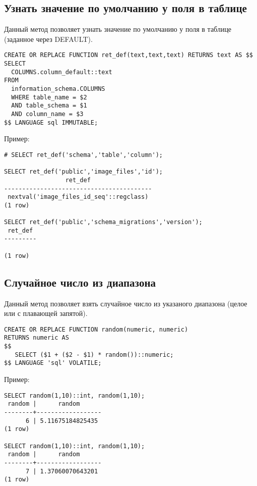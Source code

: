 \subsection{Узнать значение по умолчанию у поля в таблице}
Данный метод позволяет узнать значение по умолчанию у поля в таблице (заданное через DEFAULT).

\begin{lstlisting}[label=lst:snippets6,title=snippets/default\_value.sql]
CREATE OR REPLACE FUNCTION ret_def(text,text,text) RETURNS text AS $$
SELECT
  COLUMNS.column_default::text
FROM
  information_schema.COLUMNS
  WHERE table_name = $2
  AND table_schema = $1
  AND column_name = $3
$$ LANGUAGE sql IMMUTABLE;
\end{lstlisting}

Пример:
\begin{lstlisting}[label=lst:snippets7,caption=Узнать значение по умолчанию у поля в таблице. Пример]
# SELECT ret_def('schema','table','column');

SELECT ret_def('public','image_files','id');
                 ret_def
-----------------------------------------
 nextval('image_files_id_seq'::regclass)
(1 row)

SELECT ret_def('public','schema_migrations','version');
 ret_def
---------

(1 row)
\end{lstlisting}

\subsection{Случайное число из диапазона}
Данный метод позволяет взять случайное число из указаного диапазона (целое или с плавающей запятой).

\begin{lstlisting}[label=lst:snippets8,title=snippets/random\_from\_range.sql]
CREATE OR REPLACE FUNCTION random(numeric, numeric)
RETURNS numeric AS
$$
   SELECT ($1 + ($2 - $1) * random())::numeric;
$$ LANGUAGE 'sql' VOLATILE;
\end{lstlisting}

Пример:
\begin{lstlisting}[label=lst:snippets9,caption=Случайное число из диапазона. Пример]
SELECT random(1,10)::int, random(1,10);
 random |      random
--------+------------------
      6 | 5.11675184825435
(1 row)

SELECT random(1,10)::int, random(1,10);
 random |      random
--------+------------------
      7 | 1.37060070643201
(1 row)
\end{lstlisting}

